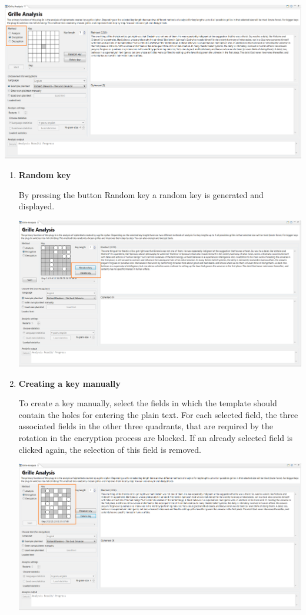 \documentclass[fontsize=12pt, DIV=15, parskip=half-]{scrartcl}
\theoremstyle{break}
\begin{document}
\includegraphics[scale=0.45]{enFleissnerEncryptSelection.png}


\begin{enumerate}[label=(\alph*), leftmargin=*]
\item \textbf{Random key}

By pressing the button \glqq Random key\grqq{} a random key is generated and displayed. 

\includegraphics[scale=0.4]{enFleissnerEncryptRandomKey.png}
\newpage

\item \textbf{Creating a key manually}

To create a key manually, select the fields in which the template should contain the holes for entering the plain text. For each selected field, the three associated fields in the other three quadrants, that are required by the rotation in the encryption process are blocked. If an already selected field is clicked again, the selection of this field is removed.

\includegraphics[scale=0.4]{enFleissnerEncryptKeySelection.png}
\end{enumerate} 
\end{document}
